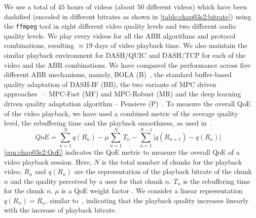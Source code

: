 We use a total of $45$ hours of videos (about $50$ different videos) which have been dashified (encoded in different bitrates as shown in \tbl\ref{table:chap03s2:bitrate}) using the {\tt ffmpeg} tool in eight different video quality levels and two different audio quality levels. We play every videos for all the \ac{ABR} algorithms and protocol combinations, resulting $\approx 19$ days of video playback time. We also maintain the similar playback environment for DASH/QUIC and DASH/TCP for each of the video and the \ac{ABR} combinations. 
We have compared the performance across five different \ac{ABR} mechanisms, namely, BOLA (B)~\cite{Spiteri2016}, the standard buffer-based quality adaptation of \ac{DASH-IF} (BB), the two variants of MPC driven approaches~\cite{yin2015control} -- MPC-Fast (MF) and MPC-Robust (MR) and the deep learning driven quality adaptation algorithm -- Pensieve (P)~\cite{mao2017neural}. To measure the overall \ac{QoE} of the video playback, we have used a combined metric of the average quality level, the rebuffering time and the playback smoothness, as used in~\cite{yin2015control,mao2017neural}.
\begin{equation}
QoE=\sum_{n=1}^{N}q(R_n)-\mu\sum_{n=1}^{N}T_n-\sum_{n=1}^{N-1} \bigg\vert q(R_{n+1})-q(R_n)  \bigg\vert
\label{eqn:chap03s2:QoE}
\end{equation}
\eqn\ref{eqn:chap03s2:QoE} indicates the \ac{QoE} metric to measure the overall \ac{QoE} of a video playback session. Here, $N$ is the total number of chunks for the playback video. $R_n$ and $q(R_n)$ are the representation of the playback bitrate of the chunk $n$ and the quality perceived by a user for that chunk $n$. $T_n$ is the rebuffering time for the chunk $n$. $\mu$ is a QoE weight factor \cite{yin2015control}.
We consider a linear representation $q(R_n) = R_n$, similar to~\cite{yin2015control}, indicating that the playback quality increases linearly with the increase of playback bitrate.
